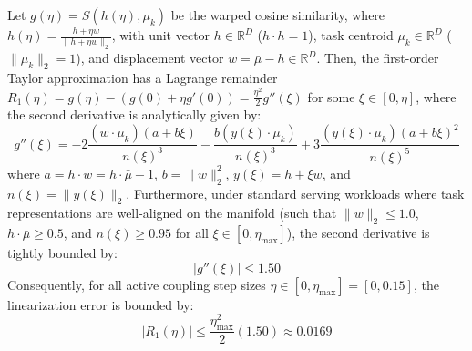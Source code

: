 \begin{theorem}
Let $g(\eta) = S(h(\eta), \mu_k)$ be the warped cosine similarity, where $h(\eta) = \frac{h + \eta w}{\|h + \eta w\|_2}$, with unit vector $h \in \mathbb{R}^D$ ($h \cdot h = 1$), task centroid $\mu_k \in \mathbb{R}^D$ ($\|\mu_k\|_2 = 1$), and displacement vector $w = \bar{\mu} - h \in \mathbb{R}^D$. Then, the first-order Taylor approximation has a Lagrange remainder $R_1(\eta) = g(\eta) - (g(0) + \eta g'(0)) = \frac{\eta^2}{2} g''(\xi)$ for some $\xi \in [0, \eta]$, where the second derivative is analytically given by:
\begin{equation}
g''(\xi) = - 2 \frac{(w \cdot \mu_k)(a + b\xi)}{n(\xi)^3} - \frac{b (y(\xi) \cdot \mu_k)}{n(\xi)^3} + 3 \frac{(y(\xi) \cdot \mu_k)(a + b\xi)^2}{n(\xi)^5}
\label{eq:second_deriv_exact}
\end{equation}
where $a = h \cdot w = h \cdot \bar{\mu} - 1$, $b = \|w\|_2^2$, $y(\xi) = h + \xi w$, and $n(\xi) = \|y(\xi)\|_2$. Furthermore, under standard serving workloads where task representations are well-aligned on the manifold (such that $\|w\|_2 \le 1.0$, $h \cdot \bar{\mu} \ge 0.5$, and $n(\xi) \ge 0.95$ for all $\xi \in [0, \eta_{\max}]$), the second derivative is tightly bounded by:
\begin{equation}
|g''(\xi)| \le 1.50
\label{eq:second_deriv_bound}
\end{equation}
Consequently, for all active coupling step sizes $\eta \in [0, \eta_{\max}] = [0, 0.15]$, the linearization error is bounded by:
\begin{equation}
|R_1(\eta)| \le \frac{\eta_{\max}^2}{2} (1.50) \approx 0.0169
\label{eq:remainder_bound_final}
\end{equation}
\end{theorem}

